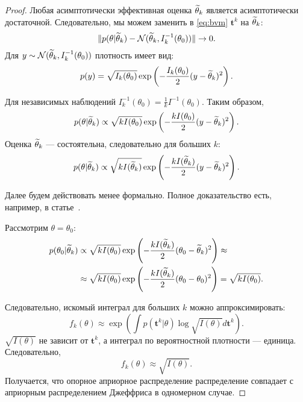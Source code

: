 \begin{proof}
Любая асимптотически эффективная оценка $\widetilde{\theta}_k$ является асимптотически достаточной.
Следовательно, мы можем заменить в \eqref{eq:bvm} $\mathbf{t}^k$ на $\widetilde{\theta}_k$:
\[
\|p(\theta | \widetilde{\theta}_k) - \mathcal{N}(\widetilde{\theta}_k, I_k^{-1}(\theta_0))\| \rightarrow 0.
\]
Для $y \sim \mathcal{N}(\widetilde{\theta}_k, I_k^{-1}(\theta_0))$ плотность имеет вид:
\[
p(y) = \sqrt{I_k(\theta_0)} \exp \left(-\frac{I_k(\theta_0)}{2} (y - \widetilde{\theta}_k)^2 \right).
\]

Для независимых наблюдений $I^{-1}_k(\theta_0) = \frac{1}{k} I^{-1}(\theta_0)$.
Таким образом,
\[
p(\theta | \widetilde{\theta}_k) \propto \sqrt{k I(\theta_0)} \exp \left(-\frac{k I(\theta_0)}{2} (y - \widetilde{\theta}_k)^2 \right).
\]
Оценка $\widetilde{\theta}_k$ --- состоятельна, следовательно для больших $k$:
\[
p(\theta | \widetilde{\theta}_k) \propto \sqrt{k I(\widetilde{\theta}_k)} \exp \left(-\frac{k I(\widetilde{\theta}_k)}{2} (y - \widetilde{\theta}_k)^2 \right).
\]

Далее будем действовать менее формально.
Полное доказательство есть, например, в статье~\cite{bernardo2005reference}.

Рассмотрим $\theta = \theta_0$:
\begin{align*}
p(\theta_0 | \widetilde{\theta}_k) &\propto \sqrt{k I(\theta_0)} \exp \left(-\frac{k I(\widetilde{\theta}_k)}{2} (\theta_0 - \widetilde{\theta}_k)^2 \right) \approx \\
&\approx \sqrt{k I(\theta_0)} \exp \left(-\frac{k I(\widetilde{\theta}_k)}{2} (\theta_0 - \theta_0)^2 \right) = \sqrt{k I(\theta_0)}.
\end{align*}

Следовательно, искомый интеграл для больших $k$ можно аппроксимировать:
\[
f_k(\theta) \approx \exp \left(\int p(\mathbf{t}^k | \theta) \log \sqrt{I(\theta)} d \mathbf{t}^k \right).
\]
$\sqrt{I(\theta)}$ не зависит от $\mathbf{t}^k$, 
а интеграл по вероятностной плотности --- единица.
Следовательно, 
\[
f_k(\theta) \approx \sqrt{I(\theta)}.
\]
Получается, что опорное априорное распределение распределение совпадает с априорным распределением Джеффриса в одномерном случае.
\end{proof}


